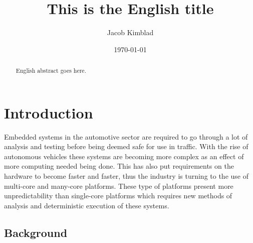\documentclass{kththesis}
\title{This is the English title}
\author{Jacob Kimblad}
\date{\today}
\begin{document}

\frontmatter

\titlepage

\begin{abstract} 

    English abstract goes here.

\end{abstract}


\begin{otherlanguage}{Swedish} 
    
    \begin{abstract}

    \end{abstract} 

\end{otherlanguage}

\printglossary[title={Acronyms}]

\tableofcontents

\mainmatter


\chapter{Introduction} 
Embedded systems in the automotive sector are required to go through a lot of analysis and testing
before being deemed safe for use in traffic. With the rise of autonomous vehicles these systems are
becoming more complex as an effect of more computing needed being done.  This has also put
requirements on the hardware to become faster and faster, thus the industry is turning to the use of
multi-core and many-core platforms. These type of platforms present more unpredictability than
single-core platforms which requires new methods of analysis and deterministic execution of these
systems. 


\section{Background} 
\end{document}

